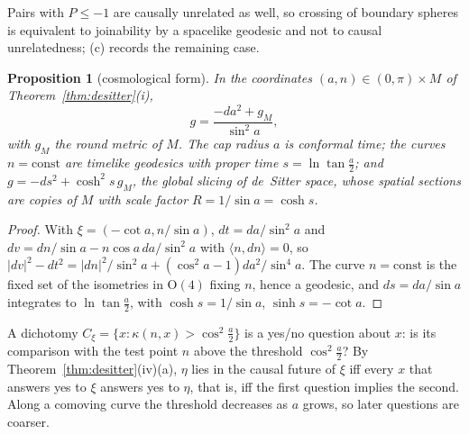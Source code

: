 \documentclass[aps,pra,onecolumn,superscriptaddress,nofootinbib,10pt]{revtex4-2}
\newtheorem{proposition}[theorem]{Proposition}
\theoremstyle{definition}
\theoremstyle{remark}
\newcommand{\ip}[2]{\langle #1,#2\rangle}
\newcommand{\OO}{\mathrm{O}}
\begin{document}
Pairs with $P\le-1$ are causally unrelated as well, so crossing of boundary spheres is equivalent to
joinability by a spacelike geodesic and not to causal unrelatedness; (c) records the remaining case.

\begin{proposition}[cosmological form]\label{prop:cosmo}
In the coordinates $(a,n)\in(0,\pi)\times M$ of Theorem~\ref{thm:desitter}(i),
\[
g=\frac{-da^2+g_M}{\sin^2a},
\]
with $g_M$ the round metric of $M$.  The cap radius $a$ is conformal time; the curves $n=\mathrm{const}$
are timelike geodesics with proper time $s=\ln\tan\frac a2$; and $g=-ds^2+\cosh^2s\,g_M$, the global
slicing of de~Sitter space, whose spatial sections are copies of $M$ with scale factor
$R=1/\sin a=\cosh s$.
\end{proposition}
\begin{proof}
With $\xi=(-\cot a,n/\sin a)$, $dt=da/\sin^2a$ and $dv=dn/\sin a-n\cos a\,da/\sin^2a$ with $\ip{n}{dn}=0$, so
$\lvert dv\rvert^2-dt^2=\lvert dn\rvert^2/\sin^2a+(\cos^2a-1)da^2/\sin^4a$.  The curve $n=\mathrm{const}$ is the
fixed set of the isometries in $\OO(4)$ fixing $n$, hence a geodesic, and $ds=da/\sin a$ integrates to
$\ln\tan\frac a2$, with $\cosh s=1/\sin a$, $\sinh s=-\cot a$.
\end{proof}
A dichotomy $C_\xi=\{x:\kappa(n,x)>\cos^2\frac a2\}$ is a yes/no question about $x$: is its comparison
with the test point $n$ above the threshold $\cos^2\frac a2$?  By Theorem~\ref{thm:desitter}(iv)(a), $\eta$
lies in the causal future of $\xi$ iff every $x$ that answers yes to $\xi$ answers yes to $\eta$, that is,
iff the first question implies the second.  Along a comoving curve the threshold decreases as $a$
grows, so later questions are coarser.
\end{document}
